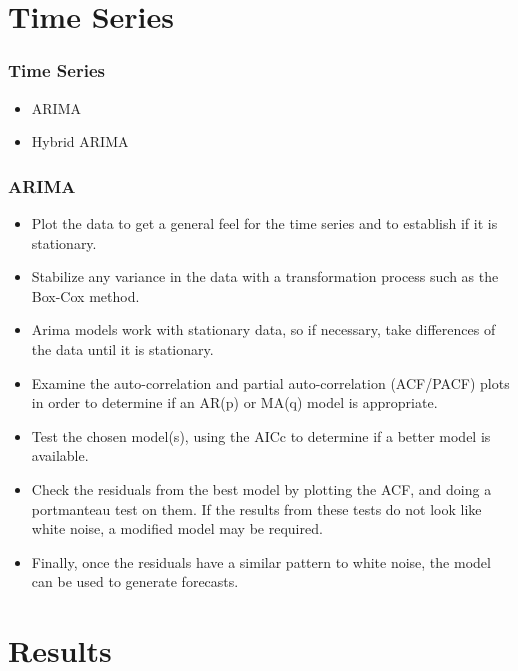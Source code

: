 \documentclass{beamer}
\begin{document}
\section{Time Series} %

\begin{frame}
\frametitle{Time Series}

\begin{itemize}
\item ARIMA
\item Hybrid ARIMA
\end{itemize}

\end{frame}

\begin{frame}
\frametitle{ARIMA}

\begin{itemize}
\item Plot the data to get a general feel for the time series and to establish if it is stationary.
\item Stabilize any variance in the data with a transformation process such as the Box-Cox method.
\item Arima models work with stationary data, so if necessary, take differences of the data until it is stationary.
\item Examine the auto-correlation and partial auto-correlation (ACF/PACF) plots in order to determine if an AR(p) or MA(q) model is appropriate.
\item Test the chosen model(s), using the AICc to determine if a better model is available.
\item Check the residuals from the best model by plotting the ACF, and doing a portmanteau test on them. If the results from these tests do not look like white noise, a modified model may be required.
\item Finally, once the residuals have a similar pattern to white noise, the model can be used to generate forecasts.
\end{itemize}

\end{frame}

\section{Results} %
\end{document}
